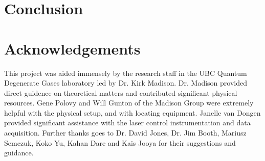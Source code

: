 \newpage
\section{Conclusion}


\section*{Acknowledgements}

This project was aided immensely by the research staff in the UBC Quantum Degenerate Gases laboratory led by Dr. Kirk Madison. Dr. Madison provided direct guidence on theoretical matters and contributed significant physical resources. Gene Polovy and Will Gunton of the Madison Group were extremely helpful with the physical setup, and with locating equipment. Janelle van Dongen provided significant assistance with the laser control instrumentation and data acquisition. Further thanks goes to Dr. David Jones, Dr. Jim Booth, Mariusz Semczuk, Koko Yu, Kahan Dare and Kais Jooya for their suggestions and guidance.